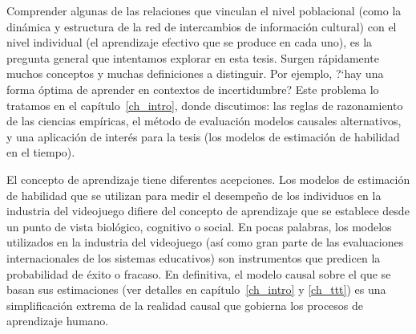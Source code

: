 \documentclass[a4paper,11pt]{book}
\theoremstyle{definition}
\begin{document}

Comprender algunas de las relaciones que vinculan el nivel poblacional (como la din\'amica y estructura de la red de intercambios de informaci\'on cultural) con el nivel individual (el aprendizaje efectivo que se produce en cada uno), es la pregunta general que intentamos explorar en esta tesis.
%
Surgen r\'apidamente muchos conceptos y muchas definiciones a distinguir.
%
Por ejemplo, ?`hay una forma \'optima de aprender en contextos de incertidumbre?
%
Este problema lo tratamos en el cap\'itulo~\ref{ch_intro}, donde discutimos: las reglas de razonamiento de las ciencias emp\'iricas, el m\'etodo de evaluaci\'on modelos causales alternativos, y una aplicaci\'on de inter\'es para la tesis (los modelos de estimaci\'on de habilidad en el tiempo).


El concepto de aprendizaje tiene diferentes acepciones.
Los modelos de estimaci\'on de habilidad que se utilizan para medir el desempe\~no de los individuos en la industria del videojuego difiere del concepto de aprendizaje que se establece desde un punto de vista biol\'ogico, cognitivo o social.
%
En pocas palabras, los modelos utilizados en la industria del videojuego (as\'i como gran parte de las evaluaciones internacionales de los sistemas educativos) son instrumentos que predicen la probabilidad de \'exito o fracaso.
%
En definitiva, el modelo causal sobre el que se basan sus estimaciones (ver detalles en cap\'itulo~\ref{ch_intro} y \ref{ch_ttt}) es una simplificaci\'on extrema de la realidad causal que gobierna los procesos de aprendizaje humano.



\end{document}
